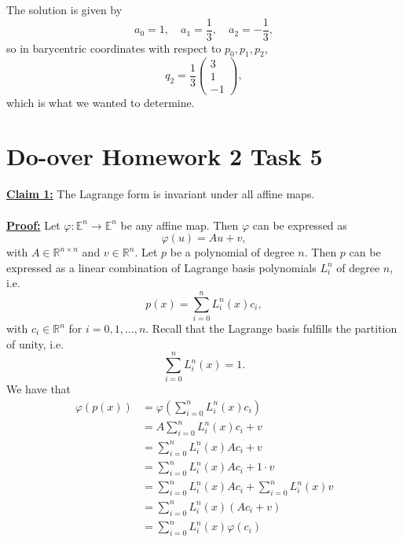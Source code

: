 \documentclass[]{article}
\begin{document}
The solution is given by \begin{equation*}
a_0 = 1, \quad a_1 = \frac{1}{3}, \quad a_2 = -\frac{1}{3},
\end{equation*}
so in barycentric coordinates with respect to $p_0, p_1, p_2$, \begin{equation*}
q_2 = \frac{1}{3}\left(\begin{array}{r}
3\\
1\\
-1
\end{array}\right),
\end{equation*}
which is what we wanted to determine.

\section*{Do-over Homework 2 Task 5}
\underline{\textbf{Claim 1:}} The Lagrange form is invariant under all affine maps.\\
\\
\underline{\textbf{Proof:}} Let $\varphi:\mathbb{E}^n\rightarrow\mathbb{E}^n$ be any affine map. Then $\varphi$ can be expressed as \begin{equation*}
\varphi(u) = Au + v,
\end{equation*}
with $A\in\mathbb{R}^{n\times n}$ and $v\in\mathbb{R}^n$. Let $p$ be a polynomial of degree $n$. Then $p$ can be expressed as a linear combination of Lagrange basis polynomials $L_i^n$ of degree $n$, i.e. \begin{equation*}
p(x) = \sum_{i = 0}^{n}L_i^n(x)c_i,
\end{equation*}
with $c_i\in\mathbb{R}^n$ for $i = 0, 1, \dots, n$. Recall that the Lagrange basis fulfills the partition of unity, i.e. \begin{equation*}
\sum_{i = 0}^{n}L_i^n(x)=1.
\end{equation*}
We have that \begin{equation*}
\begin{aligned}
\varphi(p(x)) &= \varphi\left(\sum_{i = 0}^{n}L_i^n(x)c_i\right)\\
&= A\sum_{i = 0}^{n}L_i^n(x)c_i + v\\
&= \sum_{i = 0}^{n}L_i^n(x)Ac_i + v\\
&= \sum_{i = 0}^{n}L_i^n(x)Ac_i + 1\cdot v\\
&= \sum_{i = 0}^{n}L_i^n(x)Ac_i + \sum_{i = 0}^{n}L_i^n(x)v\\
&= \sum_{i = 0}^{n}L_i^n(x)(Ac_i + v)\\
&= \sum_{i = 0}^{n}L_i^n(x)\varphi(c_i)
\end{aligned}
\end{equation*}
\end{document}
